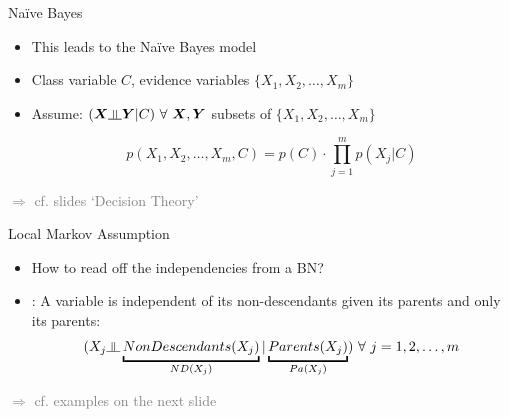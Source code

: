 \begin{frame}{Na\"{i}ve Bayes}{}
	\begin{itemize}
		\item This leads to the Na\"{i}ve Bayes model
		\item Class variable $C$, evidence variables $\{X_1, X_2, \dots, X_m\}$
		\item Assume: $(\bm{X} \indep \bm{Y} \vert C) \ \forall\ \bm{X}, \bm{Y}$ subsets of $\{X_1, X_2, \dots, X_m\}$
		
		\begin{equation}
			p(X_1, X_2, \dots, X_m, C) = p(C) \cdot \prod_{j=1}^m p(X_j \vert C)
		\end{equation}
	\end{itemize}
	\textcolor{gray}{$\Rightarrow$ cf. slides `Decision Theory'}
\end{frame}


\begin{frame}{Local Markov Assumption}{}
	\begin{itemize}
		\item How to read off the independencies from a BN?
		\item {}: A variable is independent of its non-descendants given its parents
			and only its parents:
		\begin{equation}
			(X_j \indep \underbracket{NonDescendants(X_j)}_{ND(X_j)} \vert \underbracket{Parents(X_j)}_{Pa(X_j)})\
			\forall\ j = 1, 2, \dots, m
		\end{equation}
	\end{itemize}
	\textcolor{gray}{$\Rightarrow$ cf. examples on the next slide}
\end{frame}


